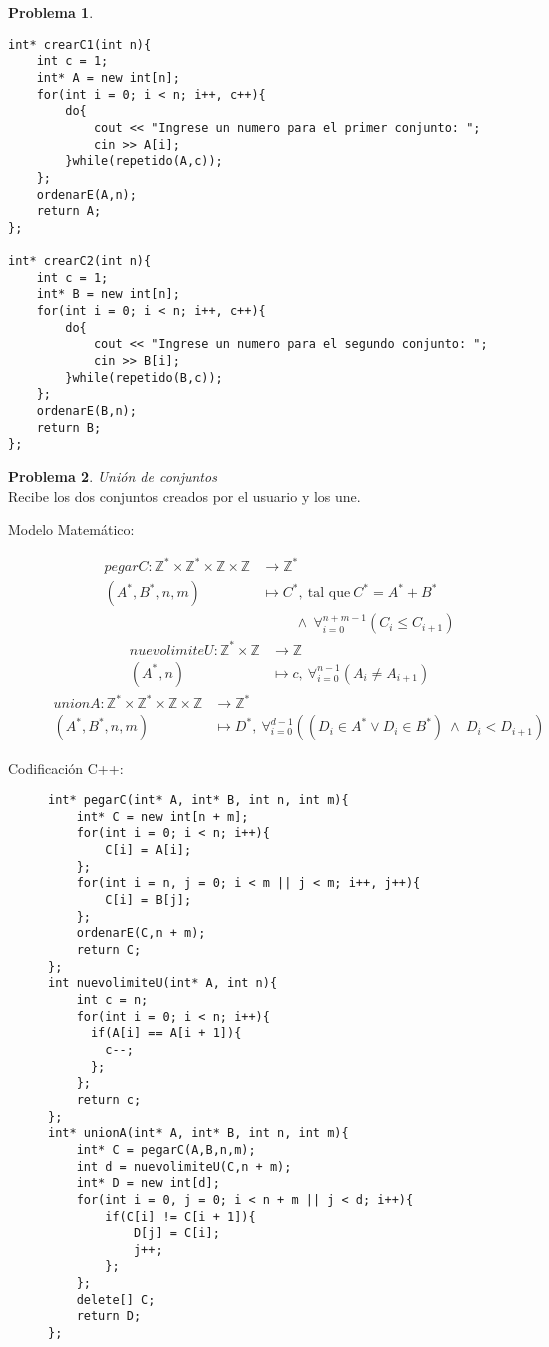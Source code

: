 \documentclass{article}
\theoremstyle{plain}
\theoremstyle{definition}
\newtheorem{problem}{Problema}
\begin{document}
\begin{problem}
\begin{description}
\begin{verbatim}
int* crearC1(int n){
    int c = 1;
    int* A = new int[n];
    for(int i = 0; i < n; i++, c++){
        do{
            cout << "Ingrese un numero para el primer conjunto: ";
            cin >> A[i];
        }while(repetido(A,c));
    };
    ordenarE(A,n);
    return A;
};

int* crearC2(int n){
    int c = 1;
    int* B = new int[n];
    for(int i = 0; i < n; i++, c++){
        do{
            cout << "Ingrese un numero para el segundo conjunto: ";
            cin >> B[i];
        }while(repetido(B,c));
    };
    ordenarE(B,n);
    return B;
};
\end{verbatim}
\end{description}
\end{problem}
\begin{problem}\emph{Unión de conjuntos}\\
Recibe los dos conjuntos creados por el usuario y los une.
\begin{description}
\item[Modelo Matemático:]
%
\begin{align*}
pegarC: \mathbb{Z}^*\times\mathbb{Z}^*\times\mathbb{Z}\times\mathbb{Z}&\to \mathbb{Z}^*\\
(A^*,B^*,n,m) &\mapsto C^*,\ \text{tal que} \ C^* = A^* + B^* \\ & 
\hspace{1cm} \land \ \forall_{i=0}^{n+m-1}(C_i \leq C_{i+1})
\end{align*}
%
\begin{align*}
nuevolimiteU: \mathbb{Z}^*\times\mathbb{Z}&\to \mathbb{Z}\\
(A^*,n) &\mapsto c,\ \forall_{i=0}^{n-1}(A_i \neq A_{i+1})
\end{align*}
%
\begin{align*}
unionA: \mathbb{Z}^*\times\mathbb{Z}^*\times\mathbb{Z}\times\mathbb{Z}&\to \mathbb{Z}^*\\
(A^*,B^*,n,m) &\mapsto D^*,\ \forall_{i=0}^{d-1}((D_i \in A^* \lor D_i \in B^*)\ \land \ D_i < D_{i+1})
\end{align*}
%
\item[Codificación \textsf{C++}:]\hfill
%
\begin{verbatim}
int* pegarC(int* A, int* B, int n, int m){
    int* C = new int[n + m];
    for(int i = 0; i < n; i++){
        C[i] = A[i];
    };
    for(int i = n, j = 0; i < m || j < m; i++, j++){
        C[i] = B[j];
    };
    ordenarE(C,n + m);
    return C;
};
int nuevolimiteU(int* A, int n){
    int c = n;
    for(int i = 0; i < n; i++){
      if(A[i] == A[i + 1]){
        c--;
      };
    };
    return c;
};
int* unionA(int* A, int* B, int n, int m){
    int* C = pegarC(A,B,n,m);
    int d = nuevolimiteU(C,n + m);
    int* D = new int[d];
    for(int i = 0, j = 0; i < n + m || j < d; i++){
        if(C[i] != C[i + 1]){
            D[j] = C[i];
            j++;
        };
    };
    delete[] C;
    return D;
};
\end{verbatim}
\end{description}
\end{problem}
\end{document}
